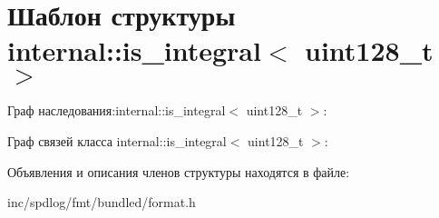 \hypertarget{structinternal_1_1is__integral_3_01uint128__t_01_4}{}\section{Шаблон структуры internal\+:\+:is\+\_\+integral$<$ uint128\+\_\+t $>$}
\label{structinternal_1_1is__integral_3_01uint128__t_01_4}


Граф наследования\+:internal\+:\+:is\+\_\+integral$<$ uint128\+\_\+t $>$\+:


Граф связей класса internal\+:\+:is\+\_\+integral$<$ uint128\+\_\+t $>$\+:


Объявления и описания членов структуры находятся в файле\+:\begin{DoxyCompactItemize}
\item 
inc/spdlog/fmt/bundled/format.\+h\end{DoxyCompactItemize}
